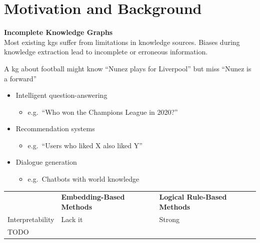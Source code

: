 

\section{Motivation and Background}\label{sec:motivation-and-background}
\begin{prob}
    \textbf{Incomplete Knowledge Graphs} \\
    Most existing \glspl{kg} suffer from limitations in knowledge
    sources.
    Biases during knowledge extraction lead to incomplete or erroneous information.
\end{prob}

\begin{bsp}
    A \gls{kg} about football might know ``Nunez plays for Liverpool'' but miss ``Nunez is a forward''
\end{bsp}


\begin{application}
    \begin{itemize}
        \item Intelligent question-answering
        \begin{itemize}
            \item e.g.\ ``Who won the Champions League in 2020?''
        \end{itemize}
        \item Recommendation systems
        \begin{itemize}
            \item e.g.\ ``Users who liked X also liked Y''
        \end{itemize}
        \item Dialogue generation
        \begin{itemize}
            \item e.g.\ Chatbots with world knowledge
        \end{itemize}
    \end{itemize}
\end{application}

\begin{mytable}
    \begin{tabular}{p{2cm} p{5cm} p{5cm} }
       &  \textbf{Embedding-Based Methods} & \textbf{Logical Rule-Based Methods} \\
        Interpretability & Lack it & Strong \\
    TODO %
    \end{tabular}\label{tab:table2}
\end{mytable}

